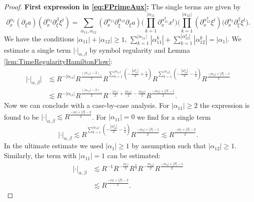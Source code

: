 \documentclass[10pt,a4paper]{amsart}
\begin{document}
\begin{proof}
\textbf{First expression in \eqref{eq:FPrimeAux}:} The single terms are given by
\begin{equation*}
    \partial_x^{\alpha_1} (\partial_{\xi} a) (\partial_x^{\alpha_2} \partial_{\xi}^{\beta} \xi^t) = \sum_{\alpha_{11},\alpha_{12}} (\partial_{x}^{\alpha_{11}} \partial_{\xi}^{\alpha_{12}} \partial_{\xi} a) \big( \prod_{k=1}^{|\alpha_{11}} \partial_x^{\alpha_{11}^k} x^t \big) \big( \prod_{k=1}^{|\alpha_{12}|} (\partial_x^{\alpha_{12}^k} \xi^t) \big( \partial_x^{\alpha_2} \partial_{\xi}^{\beta} \xi^t \big).
\end{equation*}
We have the conditions $|\alpha_{11}| + |\alpha_{12}| \geq 1$, $\sum_{k=1}^{|\alpha_{11}|} |\alpha_{11}^k| + \sum_{k=1}^{|\alpha_{12}^k|} |\alpha_{12}^k| = |\alpha_1|$. We estimate a single term $|\cdot|_{\alpha,\beta}$ by symbol regularity and Lemma \ref{lem:TimeRegularityHamiltonFlow}:
\begin{equation*}
\begin{split}
|\cdot|_{\alpha,\beta}| &\lesssim R^{-|\alpha_{11}|} R^{\frac{(|\alpha_{11}|-2)_+}{2}} R^{\sum_{k=1}^{|\alpha_{11}|} (- \frac{|\alpha_{11}^k|}{2} + \frac{1}{2})} R^{\sum_{k=1}^{|\alpha_{12}|} (- \frac{|\alpha_{12}^k|}{2} - \frac{1}{2} )} R^{\frac{-|\alpha_2|+|\beta|-1}{2}} \\
&\lesssim R^{-|\alpha_{11}|} R^{\frac{(|\alpha_{11}|-2)_+}{2}} R^{-\frac{|\alpha_1|}{2}+\frac{|\alpha_{11}|}{2}-\frac{|\alpha_{12}|}{2}} R^{\frac{-|\alpha_2|+|\beta|-1}{2}}.
\end{split}
\end{equation*}
Now we can conclude with a case-by-case analysis. For $|\alpha_{11}| \geq 2$ the expression is found to be $|\cdot|_{\alpha,\beta} \lesssim R^{\frac{-|\alpha|+|\beta|-2}{2}}$. For $|\alpha_{11}| = 0$ we find for a single term
\begin{equation*}
   |\cdot|_{\alpha,\beta} \lesssim R^{\sum_{k=1}^{|\alpha_{12}|} (- \frac{|\alpha_{12}^k|}{2} - \frac{1}{2})} R^{\frac{-|\alpha_2|+|\beta|-1}{2}} \lesssim R^{\frac{-|\alpha|+|\beta|-2}{2}}.
\end{equation*}
In the ultimate estimate we used $|\alpha_1| \geq 1$ by assumption such that $|\alpha_{12}| \geq 1$.
Similarly, the term with $|\alpha_{11}| = 1$ can be estimated:
\begin{equation*}
    \begin{split}
    |\cdot|_{\alpha,\beta} &\lesssim R^{-1} R^{-\frac{|\alpha_1|}{2}} R^{\frac{1}{2}} R^{-\frac{|\alpha_{12}|}{2}} R^{\frac{-|\alpha_2|+|\beta|-1}{2}} \\
    &\lesssim R^{\frac{-|\alpha|+|\beta|-2}{2}}.
    \end{split}
\end{equation*}


\end{proof}
\end{document}
